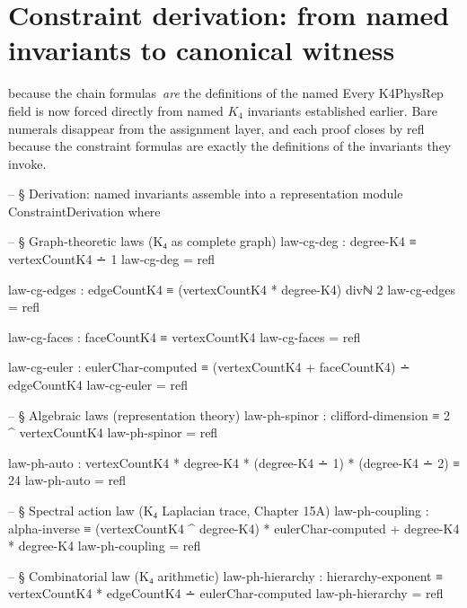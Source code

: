 \documentclass[11pt,a4paper]{book}
\def\texttt#1{#1}%
\begin{document}
\section{Constraint derivation: from named invariants to canonical witness}

because the chain formulas~\emph{are} the definitions of the named
Every \texttt{K4PhysRep} field is now forced directly from named $K_4$ invariants established earlier. Bare numerals disappear from the assignment layer, and each proof closes by \texttt{refl} because the constraint formulas are exactly the definitions of the invariants they invoke.

\begin{code}
-- § Derivation: named invariants assemble into a representation
module ConstraintDerivation where

  -- § Graph-theoretic laws (K₄ as complete graph)
  law-cg-deg : degree-K4 ≡ vertexCountK4 ∸ 1
  law-cg-deg = refl

  law-cg-edges : edgeCountK4 ≡ (vertexCountK4 * degree-K4) divℕ 2
  law-cg-edges = refl

  law-cg-faces : faceCountK4 ≡ vertexCountK4
  law-cg-faces = refl

  law-cg-euler : eulerChar-computed ≡ (vertexCountK4 + faceCountK4) ∸ edgeCountK4
  law-cg-euler = refl

  -- § Algebraic laws (representation theory)
  law-ph-spinor : clifford-dimension ≡ 2 ^ vertexCountK4
  law-ph-spinor = refl

  law-ph-auto :
    vertexCountK4 * degree-K4 * (degree-K4 ∸ 1) * (degree-K4 ∸ 2) ≡ 24
  law-ph-auto = refl

  -- § Spectral action law (K₄ Laplacian trace, Chapter 15A)
  law-ph-coupling :
    alpha-inverse ≡
    (vertexCountK4 ^ degree-K4) * eulerChar-computed + degree-K4 * degree-K4
  law-ph-coupling = refl

  -- § Combinatorial law (K₄ arithmetic)
  law-ph-hierarchy :
    hierarchy-exponent ≡ vertexCountK4 * edgeCountK4 ∸ eulerChar-computed
  law-ph-hierarchy = refl


\end{code}
\end{document}
